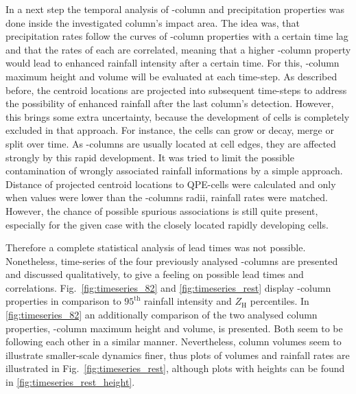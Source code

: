 In a next step the temporal analysis of \zdr-column and precipitation properties was done inside the investigated column's impact area. The idea was, that precipitation rates follow the curves of \zdr-column properties with a certain time lag and that the rates of each are correlated, meaning that a higher \zdr-column property would lead to enhanced rainfall intensity after a certain time. 
For this, \zdr-column maximum height and volume will be evaluated at each time-step. As described before, the centroid locations are projected into subsequent time-steps to address the possibility of enhanced rainfall after the last column's detection. 
However, this brings some extra uncertainty, because the development of cells is completely excluded in that approach. For instance, the cells can grow or decay, merge or split over time. As \zdr-columns are usually located at cell edges, they are affected strongly by this rapid development. 
It was tried to limit the possible contamination of wrongly associated rainfall informations by a simple approach. Distance of projected centroid locations to QPE-cells were calculated and only when values were lower than the \zdr-columns radii, rainfall rates were matched. However, the chance of possible spurious associations is still quite present, especially for the given case with the closely located rapidly developing cells.

Therefore a complete statistical analysis of lead times was not possible.
Nonetheless, time-series of the four previously analysed \zdr-columns are presented and discussed qualitatively, to give a feeling on possible lead times and correlations.
Fig.~\ref{fig:timeseries_82} and \ref{fig:timeseries_rest} display \zdr-column properties in comparison to $95^\text{th}$ rainfall intensity and $Z_\text{H}$ percentiles.
In \ref{fig:timeseries_82} an additionally comparison of the two analysed column properties, \zdr-column maximum height and volume, is presented.
Both seem to be following each other in a similar manner. Nevertheless, column volumes seem to illustrate smaller-scale dynamics finer, thus plots of volumes and rainfall rates are illustrated in Fig.~\ref{fig:timeseries_rest}, although plots with heights can be found in \ref{fig:timeseries_rest_height}.

